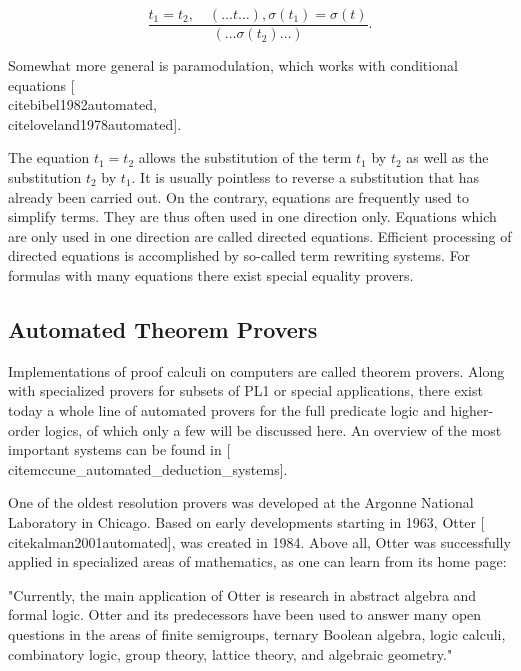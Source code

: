 \documentclass[10pt]{book}
\begin{document}
$$
\frac{t_{1}=t_{2}, \quad(\ldots t \ldots), \sigma\left(t_{1}\right)=\sigma(t)}{\left(\ldots \sigma\left(t_{2}\right) \ldots\right)} .
$$

Somewhat more general is paramodulation, which works with conditional equations [\\cite{bibel1982automated}, \\cite{loveland1978automated}].

The equation $t_{1}=t_{2}$ allows the substitution of the term $t_{1}$ by $t_{2}$ as well as the substitution $t_{2}$ by $t_{1}$. It is usually pointless to reverse a substitution that has already been carried out. On the contrary, equations are frequently used to simplify terms. They are thus often used in one direction only. Equations which are only used in one direction are called directed equations. Efficient processing of directed equations is accomplished by so-called term rewriting systems. For formulas with many equations there exist special equality provers.

\subsection*{Automated Theorem Provers}
Implementations of proof calculi on computers are called theorem provers. Along with specialized provers for subsets of PL1 or special applications, there exist today a whole line of automated provers for the full predicate logic and higher-order logics, of which only a few will be discussed here. An overview of the most important systems can be found in [\\cite{mccune_automated_deduction_systems}].

One of the oldest resolution provers was developed at the Argonne National Laboratory in Chicago. Based on early developments starting in 1963, Otter [\\cite{kalman2001automated}], was created in 1984. Above all, Otter was successfully applied in specialized areas of mathematics, as one can learn from its home page:

\begin{displayquote}
"Currently, the main application of Otter is research in abstract algebra and formal logic. Otter and its predecessors have been used to answer many open questions in the areas of finite semigroups, ternary Boolean algebra, logic calculi, combinatory logic, group theory, lattice theory, and algebraic geometry."
\end{displayquote}
\end{document}

